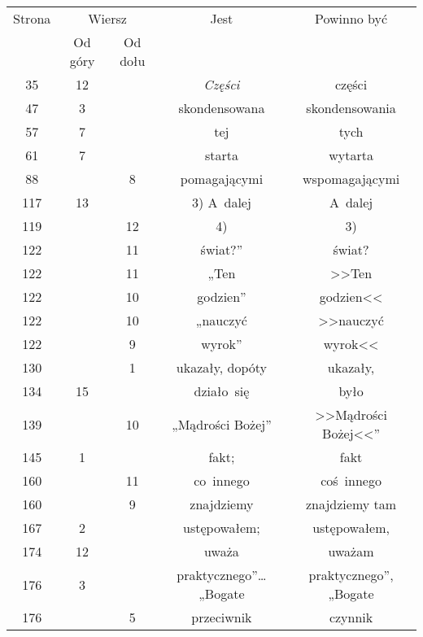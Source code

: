 \documentclass[a4paper,11pt]{article}
\begin{document}
\newpage


\vspace{\spaceFive}


\begin{center}

  \begin{tabular}{|c|c|c|c|c|}
    \hline
    Strona & \multicolumn{2}{c|}{Wiersz} & Jest
                              & Powinno być \\ \cline{2-3}
    & Od góry & Od dołu & & \\
    \hline
    \hphantom{0}35 & 12 & & \textit{Części} & części \\
    \hphantom{0}47 & \hphantom{0}3 & & skondensowana & skondensowania \\
    \hphantom{0}57 & \hphantom{0}7 & & tej & tych \\
    \hphantom{0}61 & \hphantom{0}7 & & starta & wytarta \\
    \hphantom{0}88 & & \hphantom{0}8 & pomagającymi & wspomagającymi \\
    117 & 13 & & 3) A~dalej & A~dalej \\
    119 & & 12 & 4) & 3) \\
    122 & & 11 & świat?” & świat? \\
    122 & & 11 & „Ten & >>Ten \\
    122 & & 10 & godzien” & godzien<<  %
    \\
    122 & & 10 & „nauczyć & >>nauczyć \\
    122 & & \hphantom{0}9 & wyrok” & wyrok<<  %
    \\
    130 & & \hphantom{0}1 & ukazały, dopóty & ukazały, \\
    134 & 15 & & działo~się & było \\
    139 & & 10 & „Mądrości Bożej” & >>Mądrości Bożej<<”  %
    \\
    145 & \hphantom{0}1 & & fakt; & fakt \\
    160 & & 11 & co~innego & coś~innego \\
    160 & & \hphantom{0}9 & znajdziemy & znajdziemy tam \\
    167 & \hphantom{0}2 & & ustępowałem; & ustępowałem, \\
    174 & 12 & & uważa & uważam \\
    176 & \hphantom{0}3 & & praktycznego”\ldots „Bogate
    & praktycznego”, „Bogate \\
    176 & & \hphantom{0}5 & przeciwnik & czynnik \\

\end{tabular}
\end{center}
\end{document}
